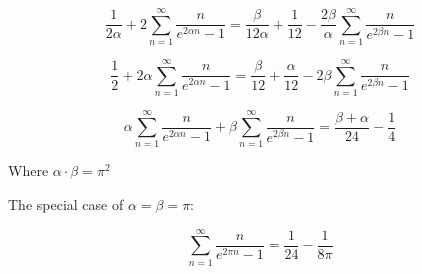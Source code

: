 \documentclass[a4paper]{article}
\begin{document}
$$
\frac{1}{2\alpha} + 2\sum_{n=1}^{\infty} \frac{n}{e^{2\alpha n}-1}
=\frac{\beta}{12\alpha}+ \frac{1}{12} -\frac{2\beta}{\alpha}\sum_{n=1}^{\infty} \frac{n}{e^{2\beta n}-1}
$$

$$
\frac{1}{2} + 2\alpha \sum_{n=1}^{\infty} \frac{n}{e^{2\alpha n}-1}
=\frac{\beta}{12}+ \frac{\alpha}{12} -2\beta\sum_{n=1}^{\infty} \frac{n}{e^{2\beta n}-1}
$$

$$\boxed{
\alpha \sum_{n=1}^{\infty} \frac{n}{e^{2\alpha n}-1}+\beta\sum_{n=1}^{\infty} \frac{n}{e^{2\beta n}-1}
=\frac{\beta+\alpha}{24}- \frac{1}{4}
}
$$

Where $\alpha \cdot \beta = \pi^2$

The special case of $\alpha=\beta=\pi$:

$$
\boxed{
\sum_{n=1}^{\infty} \frac{n}{e^{2\pi n}-1}
=\frac{1}{24}- \frac{1}{8\pi}
}
$$
\end{document}
